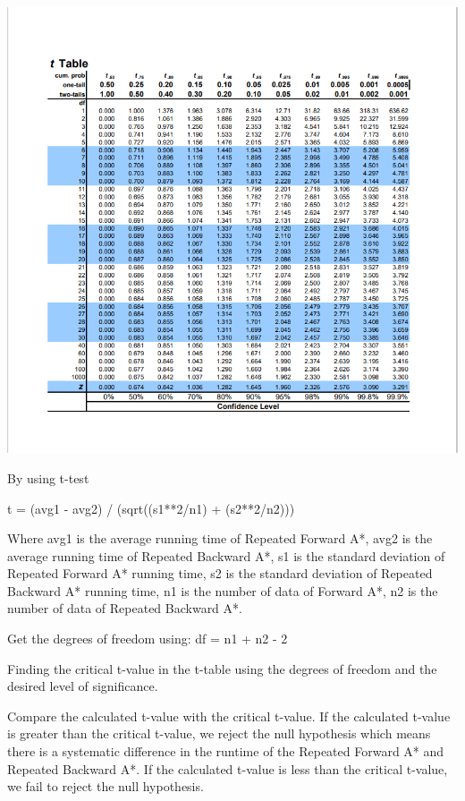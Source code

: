 \documentclass[12pt, letterpaper]{article}
\begin{document}
\includegraphics[width=\textwidth,height=\textheight]{part6a_t_table.png}


By using t-test

t = (avg1 - avg2) / (sqrt((s1**2/n1) + (s2**2/n2)))

Where avg1 is the average running time of Repeated Forward A*, avg2 is the average running time of Repeated Backward A*, s1 is the standard deviation of Repeated Forward A* running time, s2 is the standard deviation of Repeated Backward A* running time, n1 is the number of data of Forward A*, n2 is the number of data of Repeated Backward A*.

Get the degrees of freedom using: df = n1 + n2 - 2

Finding the critical t-value in the t-table using the degrees of freedom and the desired level of significance.

Compare the calculated t-value with the critical t-value. If the calculated t-value is greater than the critical t-value, we reject the null hypothesis which means there is a systematic difference in the runtime of the Repeated Forward A* and Repeated Backward A*. If the calculated t-value is less than the critical t-value, we fail to reject the null hypothesis.
\end{document}
